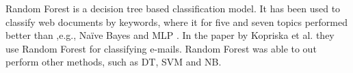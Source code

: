 Random Forest is a decision tree based classification model. It has been used to classify web documents by keywords, where it for five and seven topics performed better than ,e.g., Naïve Bayes and MLP \cite{keywords}. In the paper by Kopriska et al. they use Random Forest for classifying e-mails. Random Forest was able to out perform other methods, such as DT, SVM and NB\cite{email}.